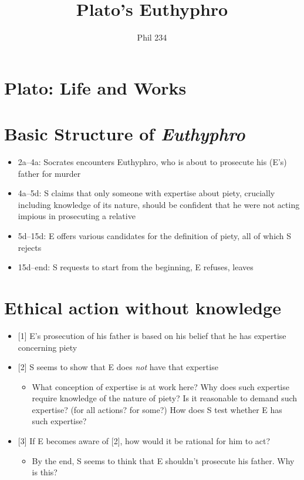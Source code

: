 \documentclass[11pt]{article}
\begin{document}
\author{Phil 234}
\title{Plato's Euthyphro}
\maketitle
\thispagestyle{empty}


\section*{Plato: Life and Works}
\vspace*{-2mm}
\section*{Basic Structure of \emph{Euthyphro}}

\begin{itemize}\item{2a--4a: Socrates encounters Euthyphro, who is about to prosecute his (E's) father for murder}\item{4a--5d: S claims that only someone with expertise about piety, crucially including knowledge of its nature, should be confident that he were not acting impious in prosecuting a relative}\item{5d--15d: E offers various candidates for the definition of piety, all of which S rejects}\item{15d--end: S requests to start from the beginning, E refuses, leaves}\end{itemize}
\vspace*{-8mm}
\section*{Ethical action without knowledge}
\begin{itemize}

\item{[1] E's prosecution of his father is based on his belief that he has expertise concerning piety}

\item{[2] S seems to show that E does \emph{not} have that expertise}\begin{itemize}\item{What conception of expertise is at work here? Why does such expertise require knowledge of the nature of piety? Is it reasonable to demand such expertise? (for all actions? for some?) How does S test whether E has such expertise?}\end{itemize}

\item{[3] If E becomes aware of [2], how would it be rational for him to act?}

\begin{itemize}\item{By the end, S seems to think that E shouldn't prosecute his father. Why is this?}\end{itemize}
\end{itemize}
\vspace*{-8mm}
\end{document}

